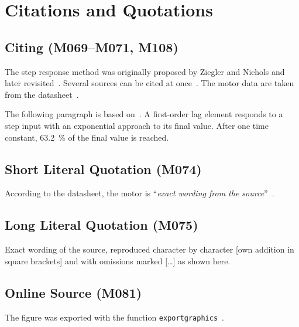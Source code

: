 \documentclass[state=Report]{mcidoc}
\begin{document}
\chapter{Citations and Quotations}

\section{Citing (M069–M071, M108)}
The step response method was originally proposed by Ziegler and Nichols and
later revisited~\cite{astrom2004}. Several sources can be cited at
once~\cite{lunze2020, skript}. The motor data are taken from the
datasheet~\cite{datenblatt}.

The following paragraph is based on~\cite{lunze2020}. A first-order lag
element responds to a step input with an exponential approach to its final
value. After one time constant, \qty{63.2}{\percent} of the final value is
reached.

\section{Short Literal Quotation (M074)}
According to the datasheet, the motor is \enquote{\textit{exact wording
from the source}}~\cite{datenblatt}.

\section{Long Literal Quotation (M075)}
\begin{displayquote}
  Exact wording of the source, reproduced character by character [own
  addition in square brackets] and with omissions marked [\dots] as shown
  here.~\cite{astrom2004}
\end{displayquote}

\section{Online Source (M081)}
The figure was exported with the function \texttt{exportgraphics}~\cite{matlabdoc}.
\end{document}
